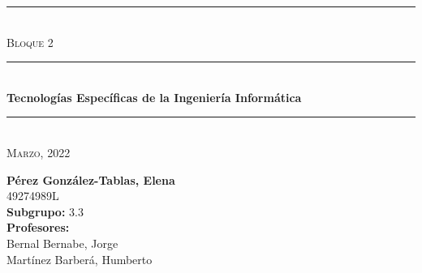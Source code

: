 \begin{titlepage}
	\begin{center}
		\rule{15cm}{0pt} \\
		[3cm]
		\textsc{\Large Bloque 2} \\
		\rule{15cm}{1pt} \\
		[0.25cm]
		\huge{\bfseries Tecnologías Específicas de la Ingeniería Informática} \\
		\rule{15cm}{1pt} \\
		[0.25cm]
		\textsc{\Large Marzo, 2022}\\
		[9cm]
	\end{center}
	\begin{flushright}
		\textbf{Pérez González-Tablas, Elena} \\
		[0.25cm]
		49274989L \\
		[0.25cm]
		\textbf{Subgrupo:} 3.3 \\
		[0.25cm]
		\textbf{Profesores:} \\
		Bernal Bernabe, Jorge \\
		Martínez Barberá, Humberto \\
	\end{flushright}
\end{titlepage}
\newpage